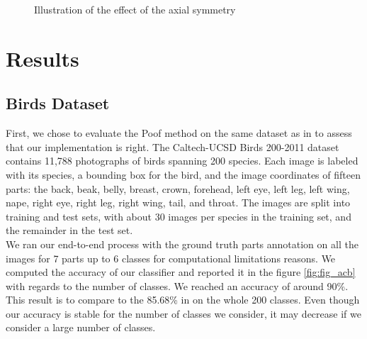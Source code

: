 \documentclass[twoside]{article}
\begin{document}
\begin{multicols}{2}
\begin{figure}[H]
\centering
{}
\quad
{}
%
\caption{Illustration of the effect of the axial symmetry}
\label{fig:fig_sym}
\end{figure}


\section{Results}

\subsection{Birds Dataset}

First, we chose to evaluate the Poof method on the same dataset as in \cite{poof} to assess that our implementation is right. The Caltech-UCSD Birds 200-2011 dataset \cite{cud} contains 11,788 photographs of birds spanning 200 species. Each image is labeled with its species, a bounding box for the bird, and the image coordinates of fifteen parts: the back, beak, belly, breast, crown, forehead, left eye, left leg, left wing, nape, right eye, right leg, right wing, tail, and throat. The images are split into training and test sets, with about 30 images per species in the training set, and the remainder in the test set.\\

We ran our end-to-end process with the ground truth parts annotation on all the images for 7 parts up to 6 classes for computational limitations reasons. We computed the accuracy of our classifier and reported it in the figure \ref{fig:fig_acb} with regards to the number of classes. We reached an accuracy of around 90\%. This result is to compare to the 85.68\% in \cite{poof} on the whole 200 classes. Even though our accuracy is stable for the number of classes we consider, it may decrease if we consider a large number of classes.\\


\end{multicols}
\end{document}
